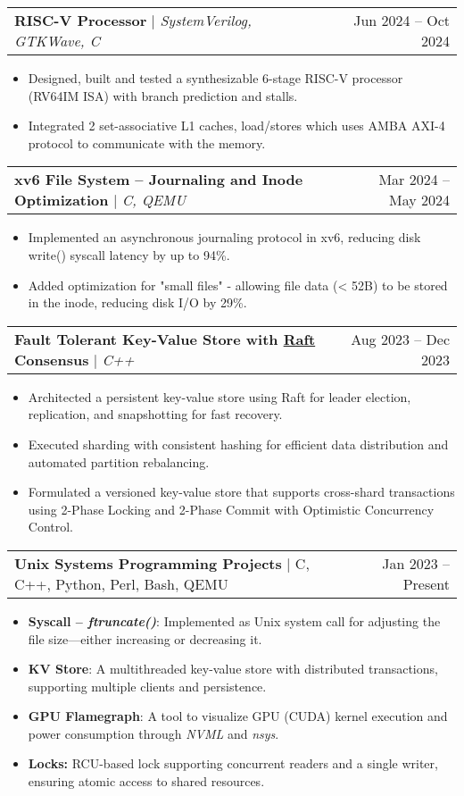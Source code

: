 \documentclass[letterpaper,11pt]{article}
\makeatletter
\newcommand{\resumeItem}[1]{
  \item\small{
    {#1 \vspace{-2pt}}
  }
}
\newcommand{\resumeProjectHeading}[2]{
    \item
    \begin{tabular*}{1.001\textwidth}{l@{\extracolsep{\fill}}r}
      \small#1 & \small #2\\
    \end{tabular*}\vspace{-7pt}
}
\newcommand{\resumeItemListStart}{\begin{itemize}}
\newcommand{\resumeItemListEnd}{\end{itemize}\vspace{-5pt}}
\makeatother
\begin{document}
\resumeProjectHeading
{\textbf{\normalsize{RISC-V Processor}} $|$ \emph{SystemVerilog, GTKWave, C}}{Jun 2024 -- Oct 2024}
\resumeItemListStart
\resumeItem{Designed, built and tested a synthesizable 6-stage RISC-V processor (RV64IM ISA) with branch prediction and stalls.}
\resumeItem{Integrated 2 set-associative L1 caches, load/stores which uses AMBA AXI-4 protocol to communicate with the memory.}
\resumeItemListEnd
\vspace{-17pt}

\resumeProjectHeading
{\textbf{\normalsize{xv6 File System -- Journaling and Inode Optimization}} $|$ \emph{C, QEMU}}{Mar 2024 -- May 2024}
\resumeItemListStart
\resumeItem{
  Implemented an asynchronous journaling protocol in xv6, reducing disk write() syscall latency by up to 94\%.
}
\resumeItem{
  Added optimization for "small files" - allowing file data (\textless{} 52B) to be stored in the inode, reducing disk I/O by 29\%.
}

\resumeItemListEnd
\vspace{-17pt}

\resumeProjectHeading
{\textbf{\normalsize{Fault Tolerant Key-Value Store with \href{https://raft.github.io/raft.pdf}{Raft} Consensus}} $|$ \emph{C++}}{Aug 2023 -- Dec 2023}
\resumeItemListStart
\resumeItem{Architected a persistent key-value store using Raft for leader election, replication, and snapshotting for fast recovery.}
\resumeItem{Executed sharding with consistent hashing for efficient data distribution and automated partition rebalancing.}
\resumeItem{Formulated a versioned key-value store that supports cross-shard transactions using 2-Phase Locking and 2-Phase Commit
  with Optimistic Concurrency Control.}
\resumeItemListEnd
\vspace{-17pt}

\resumeProjectHeading
{\textbf{\normalsize{Unix Systems Programming Projects}} $|$ C, C++, Python, Perl, Bash, QEMU}{Jan 2023 -- Present}
\resumeItemListStart
\resumeItem{
  \textbf{Syscall -- \textit{ftruncate()}}: Implemented as Unix system call for adjusting the file size—either increasing or decreasing it.
}
\resumeItem{\textbf{KV Store}: A multithreaded key-value store with distributed transactions, supporting multiple clients and persistence.}
\resumeItem{\textbf{GPU Flamegraph}: A tool to visualize GPU (CUDA) kernel execution and power consumption through \textit{NVML} and \textit{nsys}.}
\resumeItem{\textbf{Locks:} RCU-based lock supporting concurrent readers and a single writer, ensuring atomic access to shared resources.}
\resumeItemListEnd
\vspace{-17pt}
\end{document}
